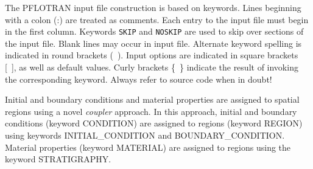 \documentclass[12pt]{article}
\begin{document}
\setcounter{equation}{0}

The PFLOTRAN input file construction is based on keywords. Lines beginning with a colon (:) are treated as comments. Each entry to the input file must begin in the first column. Keywords {\tt SKIP} and {\tt NOSKIP} are used to skip over sections of the input file. Blank lines may occur in input file. Alternate keyword spelling is indicated in round brackets (~). Input options are indicated in square brackets [~], as well as default values. Curly brackets \{~\} indicate the result of invoking the corresponding keyword. Always refer to source code when in doubt!

Initial and boundary conditions and material properties are assigned to spatial regions using a novel {\em coupler} approach. In this approach, initial and boundary conditions (keyword CONDITION) are assigned to regions (keyword REGION) using keywords INITIAL\_CONDITION and BOUNDARY\_CONDITION. Material properties (keyword MATERIAL) are assigned to regions using the keyword STRATIGRAPHY.
\end{document}
